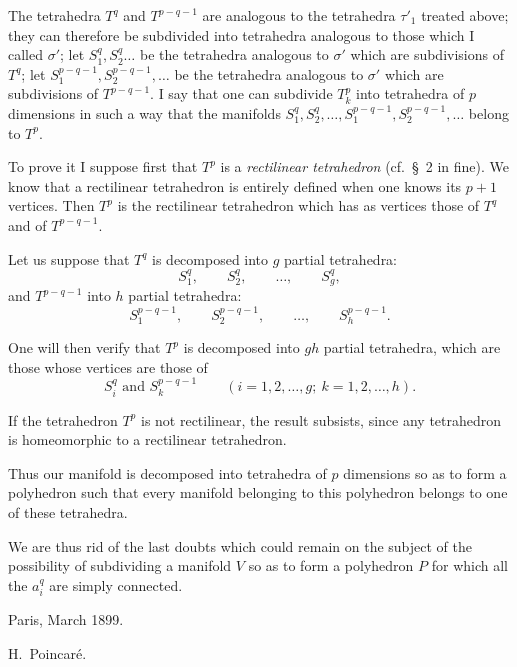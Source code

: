 \documentclass{article}
\begin{document}
The tetrahedra $T^{q}$ and $T^{p-q-1}$ are analogous to the tetrahedra $\tau'_{1}$ treated above; they can therefore be subdivided into tetrahedra analogous to those which I called $\sigma'$; let $S^{q}_{1}, S^{q}_{2} \ldots$ be the tetrahedra analogous to $\sigma'$ which are subdivisions of $T^{q}$; let $S^{p-q-1}_{1}, S^{p-q-1}_{2}, \ldots$ be the tetrahedra analogous to $\sigma'$ which are subdivisions of $T^{p-q-1}$. I say that one can subdivide $T^{p}_{k}$ into tetrahedra of $p$ dimensions in such a way that the manifolds $S^{q}_{1}, S^{q}_{2}, \ldots, S^{p-q-1}_{1}, S^{p-q-1}_{2}, \ldots$ belong to $T^{p}$.

To prove it I suppose first that $T^{p}$ is a \emph{rectilinear tetrahedron} (cf.\ \S~2 in fine). We know that a rectilinear tetrahedron is entirely defined when one knows its $p + 1$ vertices. Then $T^{p}$ is the rectilinear tetrahedron which has as vertices those of $T^{q}$ and of $T^{p-q-1}$.

Let us suppose that $T^{q}$ is decomposed into $g$ partial tetrahedra:
\[ S^{q}_{1}, \qquad S^{q}_{2}, \qquad \ldots, \qquad S^{q}_{g}, \]
and $T^{p-q-1}$ into $h$ partial tetrahedra:
\[ S^{p-q-1}_{1}, \qquad S^{p-q-1}_{2}, \qquad \ldots, \qquad S^{p-q-1}_{h}. \]


One will then verify that $T^{p}$ is decomposed into $gh$ partial tetrahedra, which are those whose vertices are those of
\[ S^{q}_{i} \text{ and } S^{p-q-1}_{k} \qquad (i = 1, 2, \ldots, g;\ k = 1, 2, \ldots, h). \]

If the tetrahedron $T^{p}$ is not rectilinear, the result subsists, since any tetrahedron is homeomorphic to a rectilinear tetrahedron.

Thus our manifold is decomposed into tetrahedra of $p$ dimensions so as to form a polyhedron such that every manifold belonging to this polyhedron belongs to one of these tetrahedra.

We are thus rid of the last doubts which could remain on the subject of the possibility of subdividing a manifold $V$ so as to form a polyhedron $P$ for which all the $a^{q}_{i}$ are simply connected.

Paris, March 1899.

H.~Poincaré.
\end{document}

